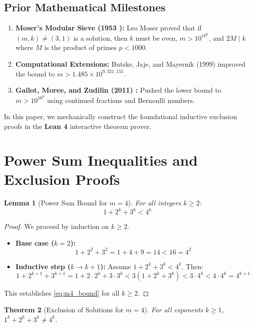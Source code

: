 \documentclass[11pt,a4paper]{article}
\newtheorem{theorem}{Theorem}[section]
\newtheorem{lemma}[theorem]{Lemma}
\theoremstyle{definition}
\begin{document}
\subsection{Prior Mathematical Milestones}
\begin{enumerate}
    \item \textbf{Moser's Modular Sieve (1953 \cite{moser1953}):} Leo Moser proved that if $(m, k) \ne (3, 1)$ is a solution, then $k$ must be even, $m > 10^{10^6}$, and $2M \mid k$ where $M$ is the product of primes $p < 1000$.
    \item \textbf{Computational Extensions:} Butske, Jaje, and Mayernik (1999) \cite{butske1999} improved the bound to $m > 1.485 \times 10^{9,321,155}$.
    \item \textbf{Gallot, Moree, and Zudilin (2011) \cite{moree2011}:} Pushed the lower bound to $m > 10^{10^9}$ using continued fractions and Bernoulli numbers.
\end{enumerate}

In this paper, we mechanically construct the foundational inductive exclusion proofs in the \textbf{Lean 4} interactive theorem prover.

\section{Power Sum Inequalities and Exclusion Proofs}

\begin{lemma}[Power Sum Bound for $m=4$]\label{lem:m4_bound}
For all integers $k \ge 2$:
\begin{equation}\label{eq:m4_bound}
1 + 2^k + 3^k < 4^k
\end{equation}
\end{lemma}

\begin{proof}
We proceed by induction on $k \ge 2$.
\begin{itemize}
    \item \textbf{Base case ($k = 2$):}
    \[ 1 + 2^2 + 3^2 = 1 + 4 + 9 = 14 < 16 = 4^2 \]
    \item \textbf{Inductive step ($k \to k+1$):} Assume $1 + 2^k + 3^k < 4^k$. Then:
    \[ 1 + 2^{k+1} + 3^{k+1} = 1 + 2 \cdot 2^k + 3 \cdot 3^k < 3 (1 + 2^k + 3^k) < 3 \cdot 4^k < 4 \cdot 4^k = 4^{k+1} \]
\end{itemize}
This establishes \eqref{eq:m4_bound} for all $k \ge 2$.
\end{proof}

\begin{theorem}[Exclusion of Solutions for $m=4$]\label{thm:m4}
For all exponents $k \ge 1$, $1^k + 2^k + 3^k \ne 4^k$.
\end{theorem}
\end{document}
